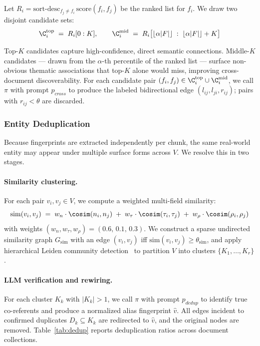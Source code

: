 \documentclass[runningheads]{llncs}
\begin{document}
Let $R_i = \mathrm{sort\text{-}desc}_{f_j \neq f_i}\, \mathrm{score}(f_i, f_j)$
be the ranked list for $f_i$. We draw two disjoint candidate sets:
\[
  \C_i^{\mathrm{top}} \;=\; R_i[0 : K],
  \qquad
  \C_i^{\mathrm{mid}} \;=\; R_i\bigl[\lfloor\alpha|F|\rfloor \;:\;
                               \lfloor\alpha|F|\rfloor + K\bigr]
\]
 
Top-$K$ candidates capture high-confidence, direct semantic connections.
Middle-$K$ candidates --- drawn from the $\alpha$-th percentile of the ranked
list --- surface non-obvious thematic associations that top-$K$ alone would
miss, improving cross-document discoverability. For each candidate pair
$(f_i, f_j) \in \C_i^{\mathrm{top}} \cup \C_i^{\mathrm{mid}}$, we call $\pi$
with prompt $p_{cross}$ to produce the labeled bidirectional edge
$(l_{ij}, l_{ji}, r_{ij})$; pairs with $r_{ij} < \theta$ are discarded.
 
\subsubsection*{Entity Deduplication}
 
Because fingerprints are extracted independently per chunk, the same real-world
entity may appear under multiple surface forms across $V$. We resolve this in
two stages.
 
\paragraph{Similarity clustering.}
For each pair $v_i, v_j \in V$, we compute a weighted multi-field similarity:
\[
  \mathrm{sim}(v_i, v_j) \;=\;
  w_n \cdot \cosim(n_i, n_j) \;+\;
  w_\tau \cdot \cosim(\tau_i, \tau_j) \;+\;
  w_\rho \cdot \cosim(\rho_i, \rho_j)
\]
with weights $(w_n, w_\tau, w_\rho) = (0.6,\, 0.1,\, 0.3)$. We construct a
sparse undirected similarity graph $G_{\mathrm{sim}}$ with an edge
$(v_i, v_j)$ iff $\mathrm{sim}(v_i, v_j) \geq \theta_{\mathrm{sim}}$, and
apply hierarchical Leiden community detection~\cite{traag2019leiden} to
partition $V$ into clusters $\{K_1, \ldots, K_r\}$.
 
\paragraph{LLM verification and rewiring.}
For each cluster $K_k$ with $|K_k| > 1$, we call $\pi$ with prompt
$p_{dedup}$ to identify true co-referents and produce a normalized alias
fingerprint $\hat{v}$. All edges incident to confirmed duplicates
$D_k \subseteq K_k$ are redirected to $\hat{v}$, and the original nodes are
removed. Table~\ref{tab:dedup} reports deduplication ratios across document
collections.
 
\end{document}
